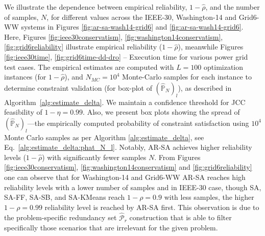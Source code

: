 We illustrate the dependence between empirical reliability, $1-\hat{\rho}$, and the number of samples, $N$, for different values across the IEEE-30, Washington-14 and Grid6-WW systems in Figures \ref{fig:ar-sa-wash14-grid6} and \ref{fig:ar-sa-wash14-grid6}. Here, Figures \ref{fig:ieee30conservatism}, \ref{fig:washington14conservatism}, \ref{fig:grid6reliability} illustrate empirical reliability ($1-\hat{\rho}$), meanwhile Figures \ref{fig:ieee30time}, \ref{fig:grid6time-dd-dro} -- Execution time for various power grid test cases. The empirical estimates are computed with $L = 100$ optimization instances (for $1-\hat{\rho}$), and $N_{MC}=10^4$ Monte-Carlo samples for each instance to determine constraint validation (for box-plot of $(\hat{\mathbb{P}}_N)_l$), as described in Algorithm~\ref{alg:estimate_delta}. We maintain a confidence threshold for JCC feasibility of $1-\eta = 0.99$. 
Also, we present box plots showing the spread of $(\hat{\mathbb{P}}_N)_l$—the empirically computed probability of constraint satisfaction using $10^4$ Monte Carlo samples as per Algorithm \ref{alg:estimate_delta}, see Eq.~\ref{alg:estimate_delta:phat_N_l}. 
Notably, AR-SA achieves higher reliability levels ($1-\hat{\rho}$) with significantly fewer samples $N$. From Figures \ref{fig:ieee30conservatism},  \ref{fig:washington14conservatism} and \ref{fig:grid6reliability} one can observe that for Washington-14 and Grid6-WW AR-SA reaches high reliability levels with a lower number of samples and in IEEE-30 case, though SA, SA-FF, SA-SB, and SA-KMeans reach $1 - \rho = 0.9$ with less samples, the higher $1 - \rho =0.99$ reliability level is reached by AR-SA first. This observation is due to the problem-specific redundancy set $\hat{\mathcal{P}}_r$ construction that is able to filter specifically those scenarios that are irrelevant for the given problem.

